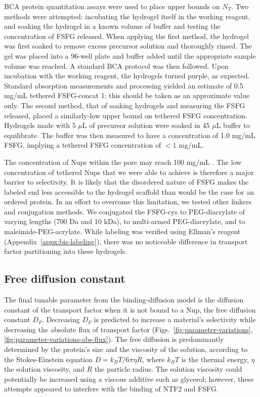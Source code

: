  BCA protein quantitation assays were used to place upper bounds on $N_T$.  Two methods were attempted: incubating the hydrogel itself in the working reagent, and soaking the hydrogel in a known volume of buffer and testing the concentration of FSFG released.  When applying the first method, the hydrogel was first soaked to remove excess precursor solution and thoroughly rinsed.  The gel was placed into a 96-well plate and buffer added until the appropriate sample volume was reached.  A standard BCA protocol was then followed.  Upon incubation with the working reagent, the hydrogels turned purple, as expected.  Standard absorption measurements and processing yielded an estimate of 0.5 mg/mL tethered FSFG-concat 1; this should be taken as an approximate value only.  The second method, that of soaking hydrogels and measuring the FSFG released, placed a similarly-low upper bound on tethered FSFG concentration.  Hydrogels made with 5 $\mu$L of precursor solution were soaked in 45 $\mu$L buffer to equilibrate.  The buffer was then measured to have a concentration of 1.0 mg/mL FSFG, implying a tethered FSFG concentration of $<1$ mg/mL.

The concentration of Nups within the pore may reach 100 mg/mL \cite{thing}.  The low concentration of tethered Nups that we were able to achieve is therefore a major barrier to selectivity.  It is likely that the disordered nature of FSFG makes the labeled end less accessible to the hydrogel scaffold than would be the case for an ordered protein.  In an effort to overcome this limitation, we tested other linkers and conjugation methods.  We conjugated the FSFG-cys to PEG-diacrylate of varying lengths (700 Da and 10 kDa), to multi-armed PEG-diacrylate, and to maleimide-PEG-acrylate.  While labeling was verified using Ellman's reagent (Appendix~\ref{appx:bis-labeling}), there was no noticeable difference in transport factor partitioning into these hydrogels.

\subsection{Free diffusion constant}

The final tunable parameter from the binding-diffusion model is the diffusion constant of the transport factor when it is not bound to a Nup, the free diffusion constant $D_F$.  Decreasing $D_F$ is predicted to increase a material's selectivity while decreasing the absolute flux of transport factor (Figs.~\ref{fig:parameter-variations}, \ref{fig:parameter-variations-abs-flux}).  The free diffusion is predominantly determined by the protein's size and the viscosity of the solution, according to the Stokes-Einstein equation $D = k_BT/6\pi\eta R$, where $k_BT$ is the thermal energy, $\eta$ the solution viscosity, and $R$ the particle radius.  The solution viscosity could potentially be increased using a viscous additive such as glycerol; however, these attempts appeared to interfere with the binding of NTF2 and FSFG.

